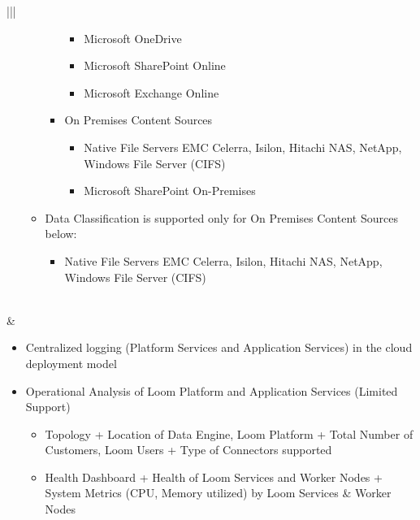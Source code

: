 \documentclass[letterpaper,10pt,english]{sphinxhowto}
\begin{document}
\begin{savenotes}
\begin{longtable}{|||}
\begin{itemize}
\begin{itemize}
\begin{itemize}
\begin{itemize}
\item {} 
Microsoft OneDrive

\item {} 
Microsoft SharePoint Online

\item {} 
Microsoft Exchange Online

\end{itemize}

\item {} 
On Premises Content Sources
\begin{itemize}
\item {} 
Native File Servers EMC Celerra, Isilon, Hitachi NAS, NetApp, Windows
File Server (CIFS)

\item {} 
Microsoft SharePoint On-Premises

\end{itemize}

\end{itemize}

\item {} 
Data Classification is supported only for On Premises Content Sources below:
\begin{itemize}
\item {} 
Native File Servers EMC Celerra, Isilon, Hitachi NAS, NetApp, Windows
File Server (CIFS)

\end{itemize}

\end{itemize}

\end{itemize}
\\
\hline
{}
&
\begin{itemize}
\item {} 
Centralized logging (Platform Services and Application Services) in the cloud
deployment model

\item {} 
Operational Analysis of Loom Platform and Application Services (Limited Support)
\begin{itemize}
\item {} 
Topology
+ Location of Data Engine, Loom Platform
+ Total Number of Customers, Loom Users
+ Type of Connectors supported

\item {} 
Health Dashboard
+ Health of Loom Services and Worker Nodes
+ System Metrics (CPU, Memory utilized) by Loom Services \& Worker Nodes


\end{itemize}
\end{itemize}
\end{longtable}
\end{savenotes}
\end{document}
